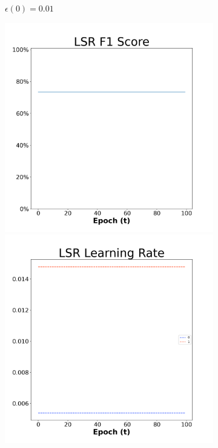 \begin{figure}[H]
\begin{subfigure}{0.3\textwidth}
  \caption{$\epsilon(0)=0.01$}
\end{subfigure}\hfil %
\begin{subfigure}{0.3\textwidth}
  \includegraphics[width=\linewidth]{images/exper2/SP/LSR_0.03_f1.png}
  \includegraphics[width=\linewidth]{images/exper2/SP/LSR_0.03_lr.png}

\end{subfigure}
\end{figure}
